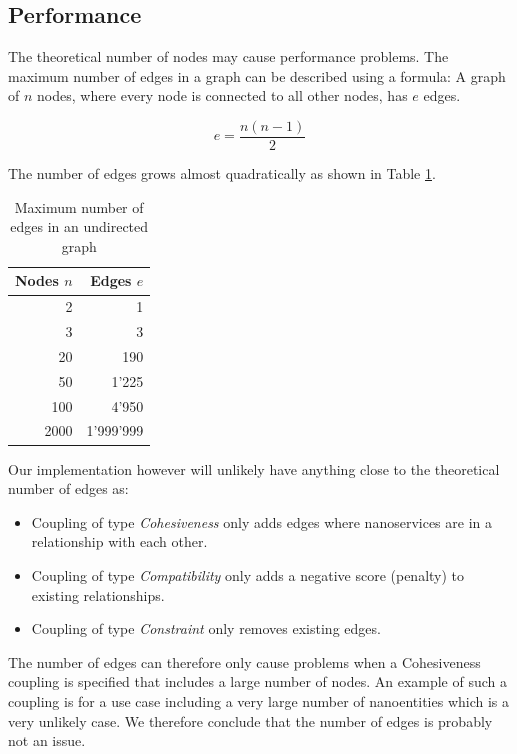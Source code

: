\subsection{Performance}


The theoretical number of nodes may cause performance problems. The maximum number of edges in a graph can be described using a formula: A graph of $n$ nodes, where every node is connected to all other nodes, has $e$ edges.

\begin{displaymath}
e = \frac{n(n-1)}{2}
\end{displaymath}

The number of edges grows almost quadratically as shown in Table \ref{tab:edgesCount}.

\begin{table}[H]
	\centering
	\caption{Maximum number of edges in an undirected graph}
	\label{tab:edgesCount}
	\begin{tabular}{|r|r|}
		\hline \textbf{Nodes} $n$ & \textbf{Edges} $e$ \\ 
		\hline 2 & 1 \\ 
		\hline 3 & 3 \\ 
		\hline 20 & 190 \\ 
		\hline 50 & 1'225 \\ 
		\hline 100 & 4'950 \\ 
		\hline 2000 & 1'999'999 \\ 
		\hline 
	\end{tabular} 
\end{table}

Our implementation however will unlikely have anything close to the theoretical number of edges as:
\begin{itemize}
	\item Coupling of type \textit{Cohesiveness} only adds edges where nanoservices are in a relationship with each other.
	\item Coupling of type \textit{Compatibility} only adds a negative score (penalty) to existing relationships.
	\item Coupling of type \textit{Constraint} only removes existing edges.
\end{itemize}

The number of edges can therefore only cause problems when a Cohesiveness coupling is specified that includes a large number of nodes. An example of such a coupling is for a use case including a very large number of nanoentities which is a very unlikely case. We therefore conclude that the number of edges is probably not an issue.


